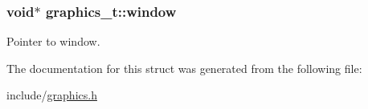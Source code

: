\subsubsection[{\texorpdfstring{window}{window}}]{\setlength{\rightskip}{0pt plus 5cm}void$\ast$ graphics\+\_\+t\+::window}\hypertarget{structgraphics__t_a2481cd19286678d56f33570ae34e406f}{}\label{structgraphics__t_a2481cd19286678d56f33570ae34e406f}
Pointer to window. 

The documentation for this struct was generated from the following file\+:\begin{DoxyCompactItemize}
\item 
include/\hyperlink{graphics_8h}{graphics.\+h}\end{DoxyCompactItemize}
